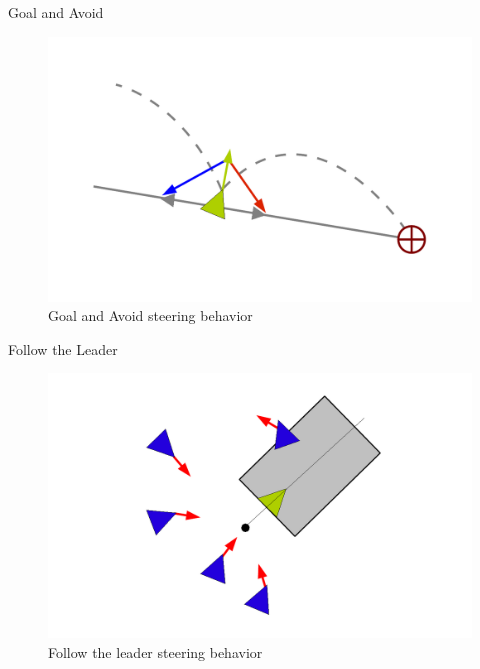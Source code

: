 \documentclass[red]{beamer}
\begin{document}
\begin{frame}{Goal and Avoid}
	\begin{figure}[htbp]
	\begin{center}
	\includegraphics[scale=0.35]{../figures/seekANDflee.pdf}
	\caption{Goal and Avoid steering behavior}
	\label{seekANDflee}
	\end{center}
	\end{figure}
\end{frame}

\begin{frame}{Follow the Leader}
	\begin{figure}[htbp]
	\begin{center}
	\includegraphics[scale=0.35]{../figures/leaderFollowing.pdf}
	\caption{Follow the leader steering behavior}
	\label{leadFollow}
	\end{center}
	\end{figure}
\end{frame}
\end{document}
